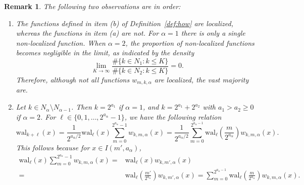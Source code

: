 \documentclass[namedate,webpdf,imanum]{ima-authoring-arxiv}%
\theoremstyle{thmstyletwo}%
\newtheorem{remark}{Remark}%
\numberwithin{equation}{section}
\begin{document}
\begin{remark}
The following two observations are in order:
\begin{enumerate}
\item The functions defined in item (b) of Definition~\ref{def:how} are localized, whereas the functions in item (a) are not. For $\alpha = 1$ there is only a single non-localized function. When $\alpha = 2$, the proportion of non-localized functions becomes negligible in the limit, as indicated by the density $$\lim_{K \to \infty} \frac{\#\{k \in N_1: k \le K\} }{ \#\{k \in N_2: k \le K\} } = 0. $$ Therefore, although not all functions $w_{m,k,\alpha}$ are localized, the vast majority are.


\item Let $k \in N_{\alpha} \setminus N_{\alpha-1}$. Then $k=2^{a_1}$ if $\alpha=1$, and $k = 2^{a_1} + 2^{a_2}$ with $a_1 > a_2 \ge 0$ if $\alpha=2$. For $\ell \in \{0,1,\ldots,2^{a_\alpha}-1\}$, we have the following relation
\begin{equation}\label{Walsh-holWalsh}
\mathrm{wal}_{k+\ell}(x) = \frac{1}{2^{a_\alpha/2}} \mathrm{wal}_{\ell}(x) \sum_{m=0}^{2^{a_\alpha}-1} w_{k,m,\alpha}(x) = \frac{1}{2^{a_\alpha/2}} \sum_{m=0}^{2^{a_\alpha-1}} \mathrm{wal}_{\ell}\left( \frac{m}{2^{a_\alpha}}\right) w_{k,m,\alpha}(x). 
\end{equation}
This follows because for $x \in I(m',a_\alpha)$,
\begin{align*}
\mathrm{wal}_{\ell}(x) \sum_{m=0}^{2^{a_\alpha}-1} w_{k,m,\alpha}(x) = &  \mathrm{wal}_{\ell}(x) w_{k,m',\alpha}(x)\\ 
= & \mathrm{wal}_{\ell}\left( \frac{m'}{2^{a_\alpha}}\right) w_{k,m',\alpha}(x) 
= \sum_{m=0}^{2^{a_\alpha-1}} \mathrm{wal}_{\ell}\left( \frac{m}{2^{a_\alpha}}\right) w_{k,m,\alpha}(x).
\end{align*}
\end{enumerate}
\end{remark}
\end{document}
